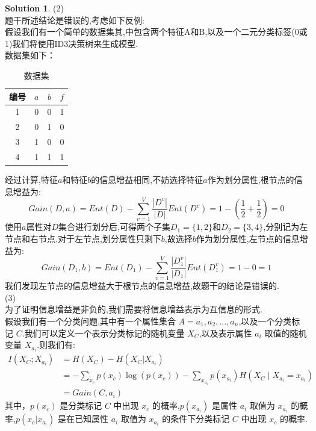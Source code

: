 \documentclass[a4paper,UTF8]{article}
\numberwithin{equation}{section}
\theoremstyle{definition}
\newtheorem*{solution}{Solution}
\begin{document}
\begin{solution}
(2)\\
题干所述结论是错误的,考虑如下反例:\\
假设我们有一个简单的数据集其,中包含两个特征A和B,以及一个二元分类标签(0或1)我们将使用ID3决策树来生成模型.\\
数据集如下：\\

\begin{table}[ht]
	\centering
	\setlength{\abovecaptionskip}{0pt}
	\setlength{\belowcaptionskip}{5pt}
	\caption{数据集}
	\begin{tabular}{c | c | c | c}
	\hline
	编号 & $a$ & $b$ & $f$ \\ \hline
	  1 &   0&    0&       1\\
	  2 &   0&    1&       0\\
	  3 &   1&    0&       0\\
	  4 &   1&    1&       1\\  \hline
	\end{tabular}
\end{table}
经过计算,特征$a$和特征$b$的信息增益相同,不妨选择特征$a$作为划分属性,根节点的信息增益为:
$$
Gain(D,a)=Ent(D) - \sum_{v=1}^V \frac{ |D^v| }{ | D | }Ent(D^v) = 1 - (\frac{1}{2} + \frac{1}{2}) = 0
$$
使用$a$属性对$D$集合进行划分后,可得两个子集$D_1=\{1,2\}$和$D_2=\{3,4\}$,分别记为左节点和右节点.对于左节点,划分属性只剩下$b$,故选择$b$作为划分属性,左节点的信息增益为:
$$
Gain(D_1,b)=Ent(D_1) - \sum_{v=1}^V \frac{ |D_1^v| }{ | D_1 | }Ent(D_1^v) = 1 - 0 = 1
$$
我们发现左节点的信息增益大于根节点的信息增益,故题干的结论是错误的.\\


(3)\\
为了证明信息增益是非负的,我们需要将信息增益表示为互信息的形式.\\
假设我们有一个分类问题,其中有一个属性集合 $A = {a_1, a_2, ..., a_n}$,以及一个分类标记 $C$.我们可以定义一个表示分类标记的随机变量 $X_C$,以及表示属性 $a_i$ 取值的随机变量 $X_{a_i}$.则我们有:
\[
	\begin{aligned}
		I(X_C;X_{a_i}) & = H(X_C) - H(X_C|X_{a_i}) \\
		& = -\sum_{x_c} p(x_c) \log (p(x_c))-\sum_{x_{a_i}} p(x_{a_i}) H(X_C \mid X_{a_i}=x_{a_i}) \\
		& = Gain(C,a_i)
	\end{aligned}
\]
其中，$p(x_c)$ 是分类标记 $C$ 中出现 $x_c$ 的概率,$p(x_{a_i})$ 是属性 $a_i$ 取值为 $x_{a_i}$ 的概率,$p(x_c | x_{a_i})$ 是在已知属性 $a_i$ 取值为 $x_{a_i}$ 的条件下分类标记 $C$ 中出现 $x_c$ 的概率.


\end{solution}
\end{document}
